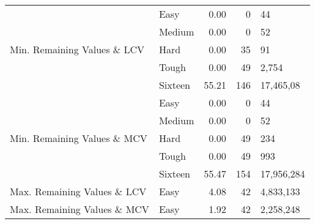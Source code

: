 \documentclass{article}
\begin{document}
{\begin{tabular}{m{15em} | l | r | r | l}
\multirow{5}{8em}{Min. Remaining Values \&{} LCV}
    & Easy   & 0.00 & 0 & 44 \\
    & Medium & 0.00 & 0 & 52 \\
    & Hard   & 0.00 & 35 & 91 \\
    & Tough  & 0.00 & 49 & 2,754 \\ 
    & Sixteen & 55.21 & 146 & 17,465,08  \\ \hline

\multirow{5}{8em}{Min. Remaining Values \&{} MCV}
    & Easy   & 0.00 & 0 & 44 \\
    & Medium & 0.00 & 0 & 52 \\
    & Hard   & 0.00 & 49 & 234 \\
    & Tough  & 0.00 & 49 & 993 \\ %
    & Sixteen & 55.47 & 154 & 17,956,284 \\ \hline
Max. Remaining Values \&{} LCV
    & Easy & 4.08 & 42 & 4,833,133 \\ \hline
Max. Remaining Values \&{} MCV
    & Easy & 1.92 & 42 & 2,258,248 \\

\end{tabular}
}
 
\end{document}
